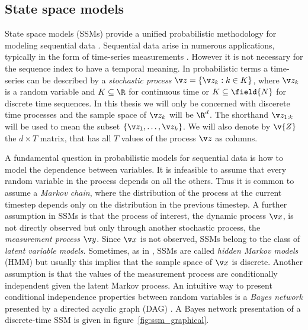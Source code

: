 \subsection{State space models}

State space models (SSMs) provide a unified probabilistic methodology for modeling
sequential data \parencite{ljung1994modeling,durbin2012time,Cappe2005,barber2011bayesian}. Sequential data arise in numerous applications, typically in the form
of time-series measurements . However it is not necessary for the sequence index to have
a temporal meaning. In probabilistic terms a time-series
can be described by a \emph{stochastic process} $\z = \left\{\z_k:k\in K\right\}$, where $\z_k$ is a random
variable and $K\subseteq\R$ for continuous time or $K\subseteq\field{N}$ for discrete time sequences. 
In this thesis we will only be concerned with discerete time processes and the sample space of $\z_k$ will be $\R^d$. 
The shorthand $\z_{1:k}$ will be used to mean the subset $\{\z_1,\dots,\z_k\}$. We will also
denote by $\v{Z}$ the $d\times T$ matrix, that has all $T$ values of the process $\z$ as columns.

A fundamental question in probabilistic models for sequential data is how 
to model the dependence between variables. It is infeasible to assume
that every random variable in the process depends on all the others.
Thus it is common to assume a \emph{Markov chain}, where the distribution of
the process at the current timestep depends only on the distribution in the previous timestep.
A further assumption in SSMs is that the process of interest, the dynamic process $\x$, is not directly observed
but only through another stochastic process, the \emph{measurement process} $\y$. Since
$\x$ is not observed, SSMs belong to the class of \emph{latent variable models}. Sometimes, as in
\textcite{Cappe2005}, SSMs are called \emph{hidden Markov models} (HMM) but usually this implies that
the sample space of $\x$ is discrete. Another assumption is that the values of the measurement process are conditionally independent
given the latent Markov process.
An intuitive way to present conditional independence properties between random
variables is a \emph{Bayes network} presented by a directed acyclic graph (DAG) \parencite{pearl1988probabilistic,Bishop2006}.
A Bayes network presentation of a discrete-time SSM is given in figure~\ref{fig:ssm_graphical}.

